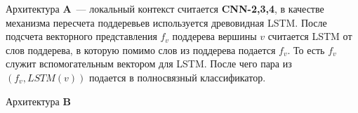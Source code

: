 Архитектура \textbf{A}~--- локальный контекст считается \textbf{CNN-2,3,4}, в качестве механизма пересчета поддеревьев используется древовидная LSTM. После подсчета векторного представления $f_v$ поддерева вершины $v$ считается LSTM от слов поддерева, в которую помимо слов из поддерева подается $f_v$. То есть $f_v$ служит вспомогательным вектором для
LSTM. После чего пара из $(f_v, LSTM(v))$ подается в полносвязный классификатор.

Архитектура \textbf{B}